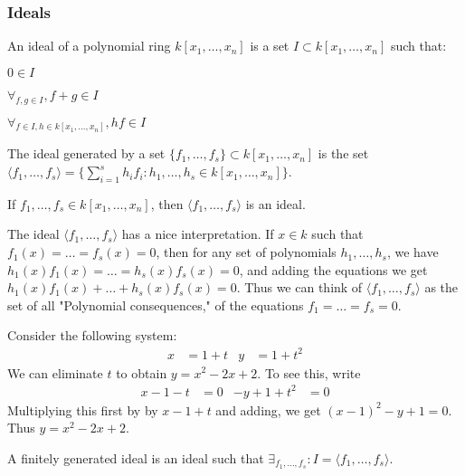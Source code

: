 \documentclass[crop=false,class=book,oneside]{standalone}
\begin{document}
\subsubsection{Ideals}
\begin{definition}
An ideal of a polynomial ring $k[x_1,\hdots ,x_n]$ is a set $I\subset k[x_1,\hdots ,x_n]$ such that:
\begin{enumerate}
\begin{multicols}{3}
    \item $0\in I$
    \item $\forall_{f,g\in I}, f+g\in I$ 
    \item $\forall_{f\in I, h\in k[x_1,\hdots ,x_n]}, hf\in I$
\end{multicols}
\end{enumerate}
\end{definition}
\begin{definition}
The ideal generated by a set $\{f_1,\hdots, f_s\} \subset k[x_1,\hdots ,x_n]$ is the set $\langle f_1,\hdots, f_s\rangle = \{\sum_{i=1}^{s} h_i f_i:h_1,\hdots, h_s\in k[x_1,\hdots ,x_n]\}$.
\end{definition}
\begin{theorem}
If $f_1,\hdots, f_s\in k[x_1,\hdots ,x_n]$, then $\langle f_1,\hdots, f_s\rangle$ is an ideal.
\end{theorem}
\begin{remark}
The ideal $\langle f_1,\hdots, f_s\rangle$ has a nice interpretation. If $x\in k$ such that $f_1(x) = \hdots = f_s(x) = 0$, then for any set of polynomials $h_1,\hdots, h_s$, we have $h_1(x)f_1(x) = \hdots = h_s(x)f_s(x) = 0$, and adding the equations we get $h_1(x)f_1(x)+\hdots + h_s(x)f_s(x) = 0$. Thus we can think of $\langle f_1,\hdots, f_s\rangle$ as the set of all "Polynomial consequences," of the equations $f_1 = \hdots = f_s = 0$.
\end{remark}
\begin{example}
Consider the following system:
\begin{align*}
    x&=1+t&y&=1+t^{2}
\end{align*}
We can eliminate $t$ to obtain $y = x^2-2x+2$. To see this, write
\begin{align*}
    x-1-t&=0&-y+1+t^{2}&=0
\end{align*}
Multiplying this first by by $x-1+t$ and adding, we get $(x-1)^2-y+1 = 0$. Thus $y = x^2-2x+2$.
\end{example}
\begin{definition}
A finitely generated ideal is an ideal such that $\exists_{f_1,\hdots, f_s}: I = \langle f_1,\hdots, f_s\rangle$.
\end{definition}
\end{document}
